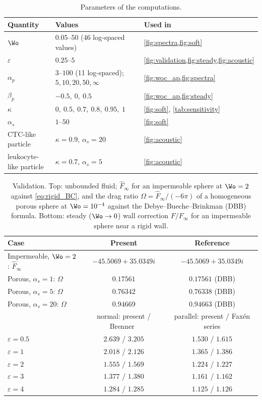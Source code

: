 \begin{table}[t]
\caption{Parameters of the computations.}
\label{tab:params}
\begin{ruledtabular}
\begin{tabular}{lll}
Quantity & Values & Used in\\
\hline
$\Wo$ & $0.05$--$50$ (46 log-spaced values) & \cref{fig:spectra,fig:soft}\\
$\varepsilon$ & $0.25$--$5$ & \cref{fig:validation,fig:steady,fig:acoustic}\\
$\alpha_p$ & $3$--$100$ (11 log-spaced); $5,10,20,50,\infty$ & \cref{fig:woc_ap,fig:spectra}\\
$\beta_p$ & $-0.5,\ 0,\ 0.5$ & \cref{fig:woc_ap,fig:steady}\\
$\kappa$ & $0,\ 0.5,\ 0.7,\ 0.8,\ 0.95,\ 1$ & \cref{fig:soft}, \cref{tab:sensitivity}\\
$\alpha_s$ & $1$--$50$ & \cref{fig:soft}\\
CTC-like particle & $\kappa=0.9$, $\alpha_s=20$ & \cref{fig:acoustic}\\
leukocyte-like particle & $\kappa=0.7$, $\alpha_s=5$ & \cref{fig:acoustic}\\
\end{tabular}
\end{ruledtabular}
\end{table}

\begin{table}[t]
\caption{Validation. Top: unbounded fluid; $\hat F_\infty$ for an impermeable sphere at $\Wo=2$ against
\cref{eq:rigid_BC}, and the drag ratio $\Omega=\hat F_\infty/(-6\pi)$ of a homogeneous porous sphere at $\Wo=10^{-4}$
against the Debye--Bueche--Brinkman (DBB) formula. Bottom: steady ($\Wo\to0$) wall correction $F/F_\infty$ for an
impermeable sphere near a rigid wall.}
\label{tab:validation}
\begin{ruledtabular}
\begin{tabular}{lcc}
Case & Present & Reference\\
\hline
Impermeable, $\Wo=2$: $\hat F_\infty$ & $-45.5069+35.0349i$ & $-45.5069+35.0349i$\\
Porous, $\alpha_s=1$: $\Omega$ & $0.17561$ & $0.17561$ (DBB)\\
Porous, $\alpha_s=5$: $\Omega$ & $0.76342$ & $0.76338$ (DBB)\\
Porous, $\alpha_s=20$: $\Omega$ & $0.94669$ & $0.94663$ (DBB)\\
\hline
 & normal: present / Brenner~\cite{brenner1961slow} & parallel: present / Faxén series\\
$\varepsilon=0.5$ & $2.639$ / $3.205$ & $1.530$ / $1.615$\\
$\varepsilon=1$ & $2.018$ / $2.126$ & $1.365$ / $1.386$\\
$\varepsilon=2$ & $1.555$ / $1.569$ & $1.224$ / $1.227$\\
$\varepsilon=3$ & $1.377$ / $1.380$ & $1.161$ / $1.162$\\
$\varepsilon=4$ & $1.284$ / $1.285$ & $1.125$ / $1.126$\\
\end{tabular}
\end{ruledtabular}
\end{table}

